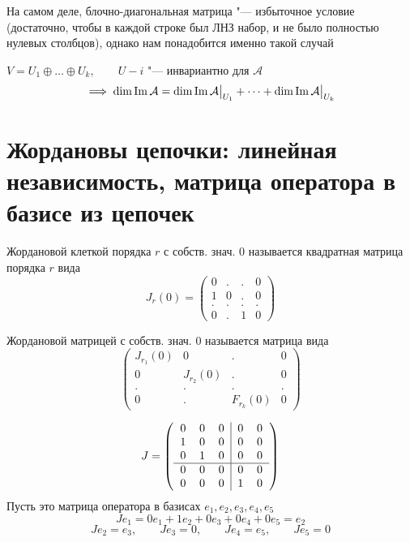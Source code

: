 \begin{remark}
	На самом деле, блочно-диагональная матрица "--- избыточное условие (достаточно, чтобы в каждой строке был ЛНЗ набор, и не было полностью нулевых столбцов), однако нам понадобится именно такой случай
\end{remark}

\begin{implication}
	$ V = U_1 \oplus \dots \oplus U_k, \qquad U-i $ "--- инвариантно для $ \mathcal{A} $
	$$ \implies \dim \operatorname{Im} \mathcal{A} = \dim \operatorname{Im} \mathcal{A}\big|_{U_1}^{} + \dots + \dim \operatorname{Im} \mathcal{A}\big|_{U_k}^{} $$
\end{implication}

\section{Жордановы цепочки: линейная независимость, матрица оператора в базисе из цепочек}

\begin{definition}
	Жордановой клеткой порядка $ r $ с собств. знач. $ 0 $ называется квадратная матрица порядка $ r $ вида
	$$ J_r(0) =
	\begin{pmatrix}
		0 & . & . & 0 \\
		1 & 0 & . & 0 \\
		. & . & . & . \\
		0 & . & 1 & 0
	\end{pmatrix} $$
\end{definition}

\begin{definition}
	Жордановой матрицей с собств. знач. $ 0 $ называется матрица вида
	$$
	\begin{pmatrix}
		J_{r_1}(0) & 0 & . & 0 \\
		0 & J_{r_2}(0) & . & 0 \\
		. & . & . & . \\
		0 & . & F_{r_k}(0) & 0
	\end{pmatrix} $$
\end{definition}

\begin{eg}
	$$ J = \left(
	\begin{tabular}{c c c | c c}
		0 & 0 & 0 & 0 & 0 \\
		1 & 0 & 0 & 0 & 0 \\
		0 & 1 & 0 & 0 & 0 \\
		\hline
		0 & 0 & 0 & 0 & 0 \\
		0 & 0 & 0 & 1 & 0 \\
	\end{tabular} \right) $$
	Пусть это матрица оператора в базисах $ e_1, e_2, e_3, e_4, e_5 $
	$$ Je_1 = 0e_1 + 1e_2 + 0e_3 + 0e_4 + 0e_5 = e_2 $$
	$$ Je_2 = e_3, \qquad Je_3 = 0, \qquad Je_4 = e_5, \qquad Je_5 = 0 $$
\end{eg}

